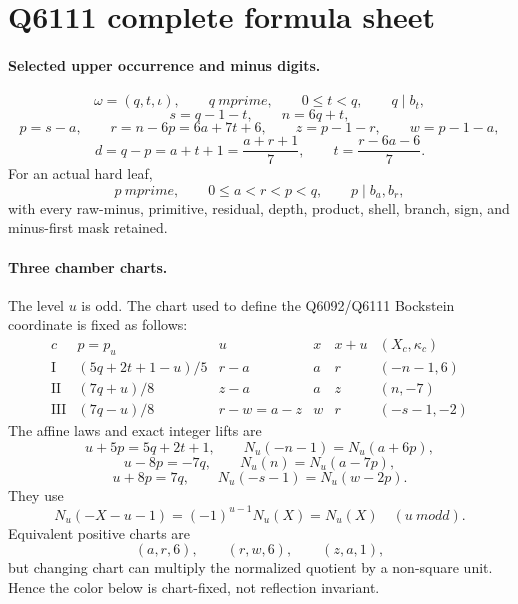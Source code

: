 \documentclass{article}
\begin{document}
\section*{Q6111 complete formula sheet}

\paragraph{Selected upper occurrence and minus digits.}
\[
 \omega=(q,t,\iota),\qquad q\ {
m prime},\qquad
 0\le t<q,\qquad q\mid b_t,
\]
\[
 s=q-1-t,\qquad n=6q+t,
\]
\[
 p=s-a,\qquad r=n-6p=6a+7t+6,
 \qquad z=p-1-r,\qquad w=p-1-a,
\]
\[
 d=q-p=a+t+1=\frac{a+r+1}{7},\qquad
 t=\frac{r-6a-6}{7}.
\]
For an actual hard leaf,
\[
 p\ {
m prime},\qquad 0\le a<r<p<q,\qquad p\mid b_a,b_r,
\]
with every raw-minus, primitive, residual, depth, product, shell,
branch, sign, and minus-first mask retained.

\paragraph{Three chamber charts.}
The level $u$ is odd.  The chart used to define the Q6092/Q6111
Bockstein coordinate is fixed as follows:
\[
\begin{array}{c|c|c|c|c|c}
 c & p=p_u & u & x & x+u & (X_c,\kappa_c)\\ \hline
 \mathrm I & (5q+2t+1-u)/5 & r-a & a & r & (-n-1,6)\\
 \mathrm {II} & (7q+u)/8 & z-a & a & z & (n,-7)\\
 \mathrm {III} & (7q-u)/8 & r-w=a-z & w & r & (-s-1,-2)
\end{array}
\]
The affine laws and exact integer lifts are
\[
 u+5p=5q+2t+1,\qquad N_u(-n-1)=N_u(a+6p),
\]
\[
 u-8p=-7q,\qquad N_u(n)=N_u(a-7p),
\]
\[
 u+8p=7q,\qquad N_u(-s-1)=N_u(w-2p).
\]
They use
\[
 N_u(-X-u-1)=(-1)^{u-1}N_u(X)=N_u(X)
 \quad (u\ {
m odd}).
\]
Equivalent positive charts are
\[
 (a,r,6),\qquad (r,w,6),\qquad (z,a,1),
\]
but changing chart can multiply the normalized quotient by a non-square
unit.  Hence the color below is chart-fixed, not reflection invariant.
\end{document}
